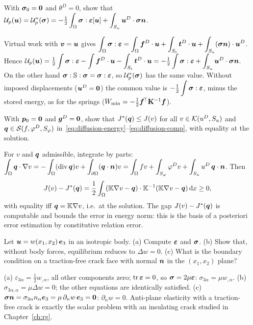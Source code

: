 \label{exo:equality}
With $\bm{\sigma}_0=\bm{0}$ and $\theta^D=0$, show that
$\displaystyle \mathcal U_p(\bm{u})=\mathcal U_p^\ast(\bm{\sigma})=-\tfrac12\int_\Omega\bm{\sigma}:\bm{\varepsilon}[\bm{u}]+\int_{S_u}\bm{u}^{D}\cdot\bm{\sigma}\bm{n}$.
\begin{solution}
Virtual work with $\bm{v}=\bm{u}$ gives
$\displaystyle \int_\Omega\bm{\sigma}:\bm{\varepsilon}=\int_\Omega\bm{f}^{D}\cdot\bm{u}+\int_{S_t}\bm{t}^{D}\cdot\bm{u}+\int_{S_u}(\bm{\sigma}\bm{n})\cdot\bm{u}^{D}$.
Hence
$\displaystyle \mathcal U_p(\bm{u})=\tfrac12\int\bm{\sigma}:\bm{\varepsilon}-\int\bm{f}^{D}\cdot\bm{u}-\int_{S_t}\bm{t}^{D}\cdot\bm{u}=-\tfrac12\int\bm{\sigma}:\bm{\varepsilon}+\int_{S_u}\bm{u}^{D}\cdot\bm{\sigma}\bm{n}$.
On the other hand $\bm{\sigma}:\mathbb{S}:\bm{\sigma}=\bm{\sigma}:\bm{\varepsilon}$, so $\mathcal U_p^\ast(\bm{\sigma})$ has
the same value. Without imposed displacements ($\bm{u}^{D}=\bm{0}$) the common
value is $\displaystyle -\tfrac12\int\bm{\sigma}:\bm{\varepsilon}$, minus the stored energy, as for the springs
($W_{\min}=-\tfrac12\bm{f}^{\!\top}\mathbf{K}^{-1}\bm{f}$).
\end{solution}

\label{exo:diff-comp}
%
With $\bm{p}_0=\bm{0}$ and $\bm{g}^D=\bm{0}$, show that $J^\ast(\bm{q})\le J(v)$ for
all $v\in\mathcal{K}(u^{D},S_u)$ and $\bm{q}\in\mathcal{S}(f,\varphi^{D},S_\varphi)$
in~\eqref{eq:diffusion-energy}--\eqref{eq:diffusion-comp}, with equality at
the solution.
\begin{solution}
For $v$ and $\bm{q}$ admissible, integrate by parts:
$\displaystyle \int_\Omega\bm{q}\cdot\nabla v=-\int_\Omega(\operatorname{div}\bm{q})v+\int_{\partial\Omega}(\bm{q}\cdot\bm{n})v
=\int_\Omega fv+\int_{S_\varphi}\varphi^{D} v+\int_{S_u}u^{D}\,\bm{q}\cdot\bm{n}$. Then
\[
  J(v)-J^\ast(\bm{q})=\frac12\int_\Omega(\mathbb{K}\nabla v-\bm{q})\cdot\mathbb{K}^{-1}(\mathbb{K}\nabla v-\bm{q})\,\mathrm{d} x\ge0 ,
\]
with equality iff $\bm{q}=\mathbb{K}\nabla v$, i.e.\ at the solution. The gap
$J(v)-J^\ast(\bm{q})$ is computable and bounds the error in energy norm: this is
the basis of a posteriori error estimation by constitutive relation error.
\end{solution}

\label{exo:antiplane}
%
Let $\bm{u}=w(x_1,x_2)\,\bm{e}_3$ in an isotropic body. (a) Compute $\bm{\varepsilon}$ and
$\bm{\sigma}$. (b) Show that, without body forces, equilibrium reduces to $\Delta w=0$.
(c) What is the boundary condition on a traction-free crack face with normal
$\bm{n}$ in the $(x_1,x_2)$ plane?
\begin{solution}
(a) $\varepsilon_{3\alpha}=\tfrac12w_{,\alpha}$, all other components zero;
$\operatorname{tr}\bm{\varepsilon}=0$, so $\bm{\sigma}=2\mu\bm{\varepsilon}$: $\sigma_{3\alpha}=\mu w_{,\alpha}$.
(b) $\sigma_{3\alpha,\alpha}=\mu\Delta w=0$; the other equations are identically
satisfied. (c) $\bm{\sigma}\bm{n}=\sigma_{3\alpha}n_\alpha\bm{e}_3=\mu\,\partial_nw\,\bm{e}_3=\bm{0}$:
$\partial_nw=0$. Anti-plane elasticity with a traction-free crack is exactly the
scalar problem with an insulating crack studied in Chapter~\ref{ch:rg}.
\end{solution}

